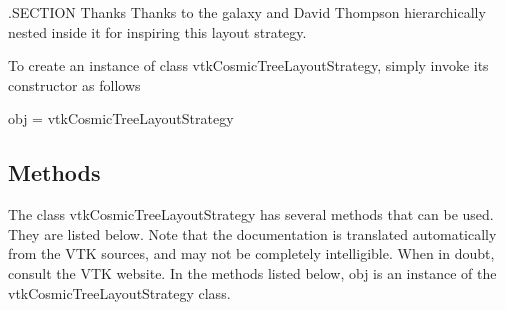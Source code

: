 .S\-E\-C\-T\-I\-O\-N Thanks Thanks to the galaxy and David Thompson hierarchically nested inside it for inspiring this layout strategy.

To create an instance of class vtk\-Cosmic\-Tree\-Layout\-Strategy, simply invoke its constructor as follows \begin{DoxyVerb}  obj = vtkCosmicTreeLayoutStrategy
\end{DoxyVerb}
 \hypertarget{vtkwidgets_vtkxyplotwidget_Methods}{}\subsection{Methods}\label{vtkwidgets_vtkxyplotwidget_Methods}
The class vtk\-Cosmic\-Tree\-Layout\-Strategy has several methods that can be used. They are listed below. Note that the documentation is translated automatically from the V\-T\-K sources, and may not be completely intelligible. When in doubt, consult the V\-T\-K website. In the methods listed below, {\ttfamily obj} is an instance of the vtk\-Cosmic\-Tree\-Layout\-Strategy class. 
